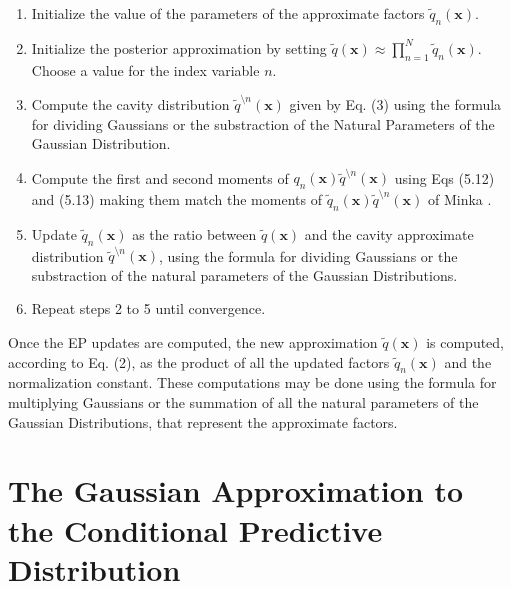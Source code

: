 \documentclass[review,preprint,12pt]{elsarticle}
\begin{document}
\begin{enumerate}
\item Initialize the value of the parameters of the approximate factors $\tilde{q}_n(\boldsymbol{x})$.
\item Initialize the posterior approximation by setting $\tilde{q}(\boldsymbol{x}) \approx \prod_{n=1}^{N} \tilde{q}_n(\boldsymbol{x})$. Choose a value for the index variable $n$.
\item Compute the cavity distribution $\tilde{q}^{\setminus n}(\boldsymbol{x})$ given by Eq. (3) using the formula for dividing Gaussians or the substraction of the Natural Parameters of the Gaussian Distribution.
\item Compute the first and second moments of $q_n(\boldsymbol{x})\tilde{q}^{\setminus n}(\boldsymbol{x})$ using Eqs (5.12) and (5.13) making them match the moments of $\tilde{q}_n(\boldsymbol{x})\tilde{q}^{\setminus n}(\boldsymbol{x})$ of Minka \citep{minka2001expectation}. 
\item Update $\tilde{q}_n(\boldsymbol{x})$ as the ratio between $\tilde{q}(\boldsymbol{x})$ and the cavity approximate distribution $\tilde{q}^{\setminus n}(\boldsymbol{x})$, using the formula for dividing Gaussians or the substraction of the natural parameters of the Gaussian Distributions.
\item Repeat steps 2 to 5 until convergence.
\end{enumerate}

Once the EP updates are computed, the new approximation $\tilde{q}(\boldsymbol{x})$ is computed, according to Eq. (2), as the product of all the updated factors $\tilde{q}_n(\boldsymbol{x})$ and the normalization constant. These computations may be done using the formula for multiplying Gaussians or the summation of all the natural parameters of the Gaussian Distributions, that represent the approximate factors.

\section{The Gaussian Approximation to the Conditional Predictive Distribution}
\end{document}
